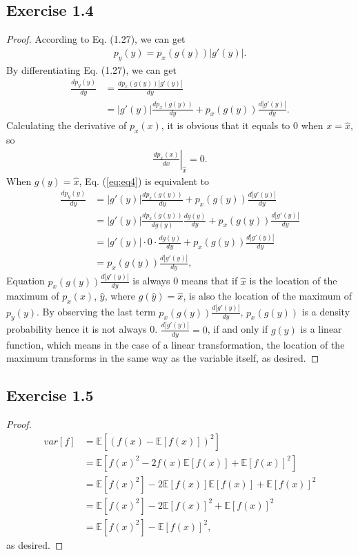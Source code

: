 \documentclass[11pt]{article}
\theoremstyle{definition}
\newcommand{\E}{\mathbb{E}}
\begin{document}
\subsection{Exercise 1.4}
\begin{proof}
According to Eq. (1.27), we can get
\begin{align*}
p_y(y) = p_x(g(y))|g'(y)|.
\end{align*}
By differentiating Eq. (1.27), we can get
\begin{align}
\frac{dp_y(y)}{dy} &= \frac{dp_x(g(y))|g'(y)|}{dy} \nonumber\\
&= |g'(y)|\frac{dp_x(g(y))}{dy} + 
 p_x(g(y))\frac{d|g'(y)|}{dy}. \label{eq:eq4}
\end{align}
Calculating the derivative of $p_x(x)$, it is obvious that it equals to 0 when $x=\hat{x}$, so
\begin{align*}
{\left.{\frac{dp_x(x)}{dx}}\right|}_{\hat{x}} = 0.
\end{align*}
When $g(y) = \hat{x}$, Eq. (\ref{eq:eq4}) is equivalent to
\begin{align}
\frac{dp_y(y)}{dy}  &= |g'(y)|\frac{dp_x(g(y))}{dy} + 
 p_x(g(y))\frac{d|g'(y)|}{dy} \nonumber\\
 &= |g'(y)|\frac{dp_x(g(y))}{dg(y)}\frac{dg(y)}{dy} + 
 p_x(g(y))\frac{d|g'(y)|}{dy}\nonumber\\
 &= |g'(y)|\cdot 0 \cdot\frac{dg(y)}{dy} + 
 p_x(g(y))\frac{d|g'(y)|}{dy}\nonumber\\
 &= p_x(g(y))\frac{d|g'(y)|}{dy},\nonumber
\end{align}
 Equation $p_x(g(y))\frac{d|g'(y)|}{dy}$ is always 0 means that if $\hat{x}$ is the location of the maximum of $p_x(x)$, $\hat{y}$, where $g(\hat{y}) = \hat{x}$, is also the location of the maximum of $p_y(y)$. By observing the last term $p_x(g(y))\frac{d|g'(y)|}{dy}$, $p_x(g(y))$ is a density probability hence it is not always 0. $\frac{d|g'(y)|}{dy} = 0$, if and only if $g(y)$ is a linear function, which means in the case of a linear transformation, the location of the maximum transforms in the same way as the variable itself, as desired.
\end{proof}

\subsection{Exercise 1.5}
\begin{proof}
\begin{align*}
var[f] &= \mathbb{E}\left[(f(x)-\mathbb{E}[f(x)])^2\right] \\
&= \mathbb{E}\left[f(x)^2 - 2f(x)\mathbb{E}[f(x)] + \mathbb{E}[f(x)]^2\right] \\
&= \mathbb{E}[f(x)^2] - 2\mathbb{E}[f(x)]\E[f(x)] + \mathbb{E}[f(x)]^2 \\
&= \mathbb{E}[f(x)^2] - 2\mathbb{E}[f(x)]^2 + \mathbb{E}[f(x)]^2\\
&= \mathbb{E}[f(x)^2] - \mathbb{E}[f(x)]^2,
\end{align*} 
as desired.
\end{proof}
\end{document}
